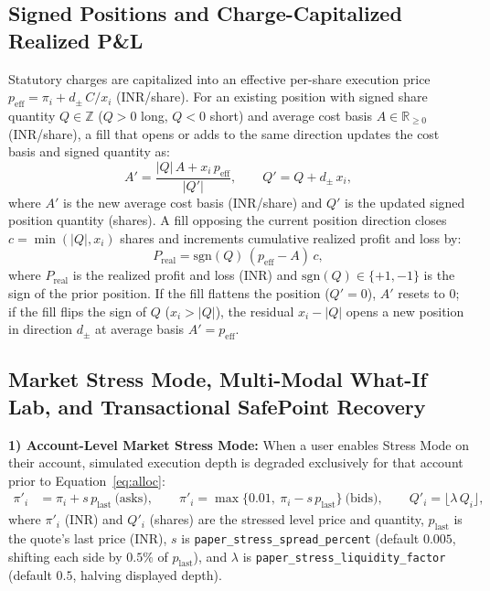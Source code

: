 \documentclass[12pt]{article}
\begin{document}
\subsection{Signed Positions and Charge-Capitalized Realized P\&L}
Statutory charges are capitalized into an effective per-share execution price $p_{\mathrm{eff}} = \pi_i + d_{\pm}\,C/x_i$ (INR/share). For an existing position with signed share quantity $Q \in \mathbb{Z}$ ($Q>0$ long, $Q<0$ short) and average cost basis $A \in \mathbb{R}_{\ge 0}$ (INR/share), a fill that opens or adds to the same direction updates the cost basis and signed quantity as:
\begin{equation}
A' = \frac{|Q|\,A + x_i\,p_{\mathrm{eff}}}{|Q'|},\qquad Q' = Q + d_{\pm}\,x_i,
\label{eq:avg}
\end{equation}
where $A'$ is the new average cost basis (INR/share) and $Q'$ is the updated signed position quantity (shares). A fill opposing the current position direction closes $c = \min(|Q|, x_i)$ shares and increments cumulative realized profit and loss by:
\begin{equation}
P_{\mathrm{real}} = \mathrm{sgn}(Q)\,(p_{\mathrm{eff}}-A)\,c,
\label{eq:pnl}
\end{equation}
where $P_{\mathrm{real}}$ is the realized profit and loss (INR) and $\mathrm{sgn}(Q) \in \{+1,-1\}$ is the sign of the prior position. If the fill flattens the position ($Q'=0$), $A'$ resets to $0$; if the fill flips the sign of $Q$ ($x_i > |Q|$), the residual $x_i - |Q|$ opens a new position in direction $d_{\pm}$ at average basis $A' = p_{\mathrm{eff}}$.

\subsection{Market Stress Mode, Multi-Modal What-If Lab, and Transactional SafePoint Recovery}
\textbf{1) Account-Level Market Stress Mode:} When a user enables Stress Mode on their account, simulated execution depth is degraded exclusively for that account prior to Equation~\eqref{eq:alloc}:
\begin{equation}
\begin{aligned}
\pi'_i &= \pi_i + s\,p_{\mathrm{last}} \ \text{(asks)},\qquad
\pi'_i = \max\{0.01,\ \pi_i - s\,p_{\mathrm{last}}\} \ \text{(bids)},\qquad
Q'_i = \lfloor \lambda\,Q_i \rfloor,
\end{aligned}
\label{eq:stress}
\end{equation}
where $\pi'_i$ (INR) and $Q'_i$ (shares) are the stressed level price and quantity, $p_{\mathrm{last}}$ is the quote's last price (INR), $s$ is \texttt{paper\_stress\_spread\_percent} (default $0.005$, shifting each side by $0.5\%$ of $p_{\mathrm{last}}$), and $\lambda$ is \texttt{paper\_stress\_liquidity\_factor} (default $0.5$, halving displayed depth).
\end{document}
